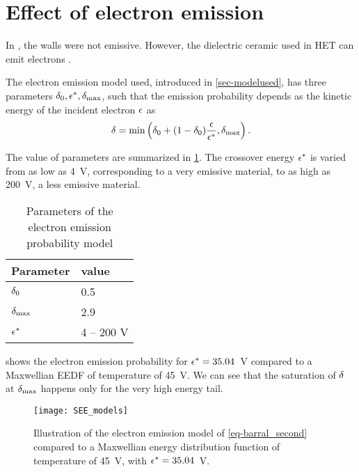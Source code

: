 
\section{Effect of electron emission}
  \label{sec-see}
  
  In , the walls were not emissive.
  However, the dielectric ceramic used in \ac{HET} can emit electrons \citep{villemant,barral2003a}.
  
  The electron emission model used, introduced in \cref{sec-modelused}, has three parameters $\delta _0, \epsilon^*, \delta _{\rm max} $, such that the emission probability depends as the kinetic energy of the incident electron $\epsilon$ as
  \begin{equation} \label{eq-barral_second}
    \delta  = \min \left( \delta _0 + (1 -  \delta _0) \frac{\epsilon}{\epsilon^*}, \delta _{\rm max}     \right).
  \end{equation}
  
  The value of parameters are summarized in \cref{tab-tabe_parameters_see}.
  The crossover energy $\epsilon^*$ is varied from as low as 4~V, corresponding to a very emissive material, to as high as 200~V, a less emissive material.
  
  \begin{table}[hbtp]
    \centering
    \caption{Parameters of the electron emission probability model}
    \label{tab-tabe_parameters_see}
    \begin{tabular}{@{}ll@{}} \toprule
    Parameter & value  \\ \midrule
    $\delta _0$ & 0.5  \\
    $\delta _{\rm max} $ & 2.9 \\
    $\epsilon^*$   &  4  -- 200 V\\
    \bottomrule
    \end{tabular}
  \end{table}
  
   shows the electron emission probability for $\epsilon^*=35.04$~V compared to a Maxwellian \ac{EEDF} of temperature of 45~V.
  We can see that the saturation of $\delta $ at $\delta _{\rm max} $ happens only for the very high energy tail.
  
  \begin{figure}[hbtp]
    \centering
    \texttt{[image: SEE\_models]}
    \caption{Illustration of the electron emission model of \cref{eq-barral_second} compared to a Maxwellian energy distribution function of temperature of 45~V, with $\epsilon^*=35.04$~V.}
    \label{fig-see_illustration}
  \end{figure}
  
